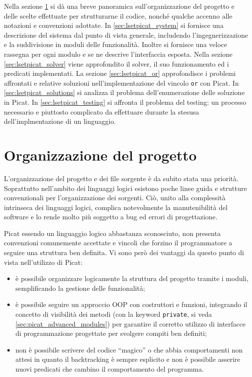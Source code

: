 \documentclass[12pt,a4paper,openright]{book} %
\begin{document}
\minitoc

Nella sezione \ref{sec:lsetpicat_project} si dà una breve panoramica
sull'organizzazione del progetto e delle scelte effettuate per
strutturarne il codice, nonché qualche accenno alle notazioni e
convenzioni adottate. In \ref{sec:lsetpicat_system} si fornisce una
descrizione del sistema dal punto di vista generale, includendo
l'ingegnerizzazione e la suddivisione in moduli delle
funzionalità. Inoltre si fornisce una veloce rassegna per ogni modulo
e se ne descrive l'interfaccia esposta. Nella sezione
\ref{sec:lsetpicat_solver} viene approfondito il solver, il suo
funzionamento ed i predicati implementati. La sezione
\ref{sec:lsetpicat_or} approfondisce i problemi affrontati e relative
soluzioni nell'implementazione del vincolo \texttt{or} con Picat. In
\ref{sec:lsetpicat_solutions} si analizza il problema
dell'enumerazione delle soluzione in Picat. In
\ref{sec:lsetpicat_testing} si affronta il problema del testing: un
processo necessario e piuttosto complicato da effettuare durante la
stesusa dell'implmentazione di un linguaggio.

\section{Organizzazione del progetto}
\label{sec:lsetpicat_project}

L'organizzazione del progetto e dei file sorgente è da subito stata
una priorità. Soprattutto nell'ambito dei linguaggi logici esistono
poche linee guida e strutture convenzionali per l'organizzazione dei
sorgenti. Ciò, unito alla complessità intrinseca dei linguaggi logici,
complica notevolmente la manutenibilità del software e lo rende molto
più soggetto a bug ed errori di progettazione.

Picat essendo un linguaggio logico abbastanza sconosciuto, non
presenta convenzioni comunemente accettate e vincoli che forzino il
programmatore a seguire una struttura ben definita. Vi sono però dei
vantaggi da questo punto di vista nell'utilizzo di Picat:
\begin{itemize}
	\item è possibile organizzare logicamente la struttura del
          progetto tramite i moduli, semplificando la gestione delle
          funzionalità;
	\item è possibile seguire un approccio OOP con costruttori e
          funzioni, integrando il concetto di visibilità dei metodi
          (con la keyword \texttt{private}, si veda
          \ref{sec:picat_advanced_modules}) per garantire il corretto
          utilizzo di interfacce di programmazione progettate per
          svolgere compiti ben definiti;
	\item non è possibile scrivere del codice ``magico'' o che
          abbia comportamenti non attesi in quanto il backtracking è
          sempre esplicito e non è possibile asserire nuovi predicati
          che cambino il comportamento del programma.
\end{itemize}
\end{document}
